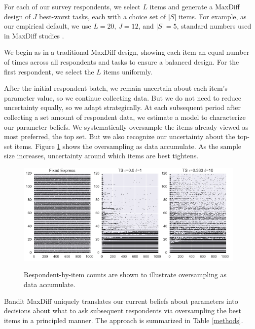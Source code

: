 \documentclass[nonblindrev]{informs3}
\newcommand{\numperset}{L}
\begin{document}
For each of our survey respondents, we select $\numperset$ items and generate a MaxDiff design of $J$ best-worst tasks, each with a choice set of $|S|$ items. For example, as our empirical default, we use $\numperset=20$, $J=12$, and $|S|=5$, standard numbers used in MaxDiff studies \citep{wirth2012largeset}. 

We begin as in a traditional MaxDiff design, showing each item an equal number of times across all respondents and tasks to ensure a balanced design.  For the first respondent, we select the $\numperset$ items uniformly. 

After the initial respondent batch, we remain uncertain about each item's parameter value, so we continue collecting data. But we do not need to reduce uncertainty equally, so we adapt strategically. At each subsequent period after collecting a set amount of respondent data, we estimate a model to characterize our parameter beliefs. We systematically oversample the items already viewed as most preferred, the top set. But we also recognize our uncertainty about the top-set items. Figure \ref{fig:dots} shows the oversampling as data accumulate. As the sample size increases, uncertainty around which items are best tightens.

\begin{figure}[!ht]
\caption{Respondent-by-item counts are shown to illustrate oversampling as data accumulate.}
\includegraphics[width=1\textwidth]{plots/3dotplot-lowres.png}
\label{fig:dots}
\end{figure}

Bandit MaxDiff uniquely translates our current beliefs about parameters into decisions about what to ask subsequent respondents via oversampling the best items in a principled manner. The approach is summarized in Table \ref{methods}.
\end{document}
